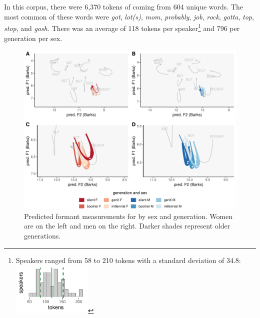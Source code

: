 \section{\lot}
\label{BOT}

In this corpus, there were 6,370 tokens of \lot coming from 604 unique words. The most common of these words were \textit{got}, \textit{lot(s)}, \textit{mom}, \textit{probably}, \textit{job}, \textit{rock}, \textit{gotta}, \textit{top}, \textit{stop}, and \textit{gosh}. There was an average of 118 tokens per speaker\footnote{Speakers ranged from 58 to 210 tokens with a standard deviation of 34.8: \includegraphics[width = 1.5in]{Figures/BOT/BOT_tiny.pdf}} and 796 per generation per sex.



\begin{figure}[tb!]
	\centering
	\includegraphics[width = 6.5in]{Figures/BOT/BOT_four_panel_plot.pdf}
	\caption[Predicted formant measurements for \lot by sex and generation.]{Predicted formant measurements for \lot by sex and generation. Women are on the left and men on the right. Darker shades represent older generations.}
	\label{fig:BOT_four_panel}
\end{figure}


